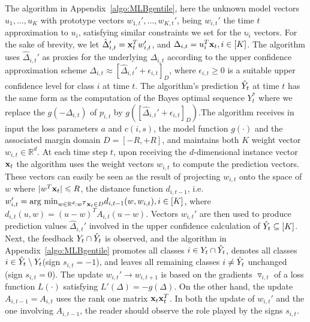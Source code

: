 The algorithm in Appendix~\ref{algo:MLBgentile}, here the unknown model vectors $u_1,\dots, u_K$ with prototype vectors $w_{1,t}',\dots,w_{K,t}'$, being $w_{i,t}'$ the time $t$ approximation to $u_i$, satisfying similar constraints we set for the $\mathbb{u}_i$ vectors. For the sake of brevity, we let $\hat{\Delta}_{i,t}' = \mathbf{x}_t^Tw_{i,t}'$, and $\Delta_{i,t} = u_i^T\mathbf{x}_t, i \in [K]$. The algorithm uses $\hat{\Delta}_{i,t}'$  as proxies for the underlying $\Delta_{i,t}$ according to the upper confidence approximation scheme $\Delta_{i,t}\approx [\hat{\Delta}_{i,t}'+\epsilon_{i,t}]_D$, where $\epsilon_{i,t}\geqslant 0$ is a suitable upper confidence level for class $i$ at time $t$. The algorithm's prediction $\hat{Y}_t$ at time $t$ has the same form as the computation of the Bayes optimal sequence $Y_t^{\ast}$ where we replace the $g(-\Delta_{i,t})$ of $p_{i,t}$ by $g([\hat{\Delta}_{i,t}'+\epsilon_{i,t}]_D)$.The algorithm receives in input the loss parameters $a$ and $c(i,s)$, the model function $g(\cdot)$ and the associated margin domain $D=[-R,+R]$, and maintains both $K$ weight vector $w_{i,t}\in \mathbb{R}^d$. At each time step $t$, upon receiving the $d$-dimensional instance vector $\mathbf{x}_t$ the algorithm uses the weight vectors $w_{i,t}$ to compute the prediction vectors. These vectors can easily be seen as the result of projecting $w_{i,t}$ onto the space of $w$ where $|w^T\mathbf{x}_t|\leqslant R$,  the distance function $d_{i,t-1}$, i.e. $w_{i,t}' = \text{arg min}_{w\in \mathbb{R}^d: w^T\mathbf{x}_t\in D}d_{i,t-1}(w,w_{i,t}), i\in [K]$, where $d_{i,t}(u,w) = (u-w)^TA_{i,t}(u-w)$. Vectors $w_{i,t}'$ are then used to produce prediction values $\hat{\Delta}_{i,t}'$ involved in the upper confidence calculation of $\hat{Y}_t \subseteq [K]$. Next, the feedback $Y_t\cap \hat{Y}_t$ is observed, and the algorithm in Appendix~\ref{algo:MLBgentile} promotes all classes $i\in Y_t\cap\hat{Y}_t$, denotes all classes $i\in \hat{Y}_t\setminus Y_t$(sign $s_{i,t}=-1$), and leaves all remaining classes $i\neq\hat{Y}_t$ unchanged (sign $s_{i,t}=0$).  The update $w_{i,t}' \rightarrow w_{i,t+1}$ is based on the gradients $\triangledown_{i,t}$ of a loss function $L(\cdot)$ satisfying $L'(\Delta) = -g(\Delta)$. On the other hand, the update $A_{i,t-1} = A_{i,t}$ uses the rank one matrix $\mathbf{x}_t\mathbf{x}_t^T$. In both the update of $w_{i,t}'$ and the one involving $A_{i,t-1}$, the reader should observe the role played by the signs $s_{i,t}$. 

